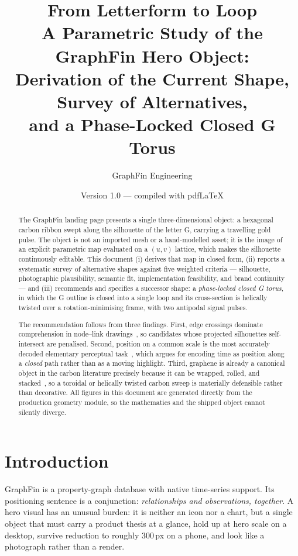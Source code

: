 \documentclass[11pt,a4paper]{article}
\title{\textbf{From Letterform to Loop}\\[2pt]
\large A Parametric Study of the GraphFin Hero Object:\\
\large Derivation of the Current Shape, Survey of Alternatives,\\
and a Phase-Locked Closed G Torus}
\author{GraphFin Engineering}
\date{Version 1.0 --- compiled with pdfLaTeX}
\theoremstyle{definition}
\begin{document}
\color{graphfinink}
\pagecolor{paperbg}

\begin{abstract}
\noindent
The GraphFin landing page presents a single three-dimensional object: a
hexagonal carbon ribbon swept along the silhouette of the letter G, carrying a
travelling gold pulse. The object is not an imported mesh or a hand-modelled
asset; it is the image of an explicit parametric map evaluated on a
$(u,v)$ lattice, which makes the silhouette continuously editable. This
document (i) derives that map in closed form, (ii) reports a systematic survey
of alternative shapes against five weighted criteria --- silhouette,
photographic plausibility, semantic fit, implementation feasibility, and brand
continuity --- and (iii) recommends and specifies a successor shape: a
\emph{phase-locked closed G torus}, in which the G outline is closed into a
single loop and its cross-section is helically twisted over a
rotation-minimising frame, with two antipodal signal pulses.

The recommendation follows from three findings. First, edge crossings dominate
comprehension in node--link drawings~\cite{purchase1997}, so candidates whose
projected silhouettes self-intersect are penalised. Second, position on a
common scale is the most accurately decoded elementary perceptual
task~\cite{cleveland1984}, which argues for encoding time as position along a
\emph{closed} path rather than as a moving highlight. Third, graphene is
already a canonical object in the carbon literature precisely because it can be
wrapped, rolled, and stacked~\cite{geim2007}, so a toroidal or helically
twisted carbon sweep is materially defensible rather than decorative. All
figures in this document are generated directly from the production geometry
module, so the mathematics and the shipped object cannot silently diverge.
\end{abstract}

\section{Introduction}

GraphFin is a property-graph database with native time-series support. Its
positioning sentence is a conjunction: \emph{relationships and observations,
together}. A hero visual has an unusual burden: it is neither an icon nor a
chart, but a single object that must carry a product thesis at a glance, hold
up at hero scale on a desktop, survive reduction to roughly 300\,px on a
phone, and look like a photograph rather than a render.
\end{document}
